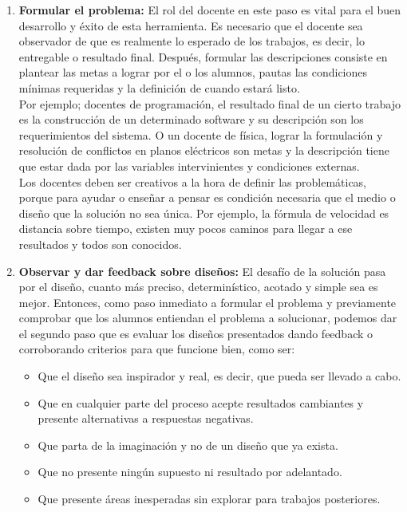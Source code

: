 \begin{enumerate}
 \item \textbf{Formular el problema:}
 El rol del docente en este paso es vital para el buen desarrollo y \'exito de esta herramienta. Es necesario que el docente sea observador de que es realmente
 lo esperado de los trabajos, es decir, lo entregable o resultado final. Despu\'es, formular las descripciones consiste en plantear las metas a lograr por el o 
 los alumnos, pautas las condiciones m\'inimas requeridas y la definici\'on de cuando estar\'a listo.\\
 Por ejemplo; docentes de programaci\'on, el resultado final de un cierto trabajo es la construcci\'on de un determinado software y su descripci\'on son los 
 requerimientos del sistema. O un docente de f\'isica, lograr la formulaci\'on y resoluci\'on de conflictos en planos el\'ectricos son metas y la descripci\'on
 tiene que estar dada por las variables intervinientes y condiciones externas.\\ 
 Los docentes deben ser creativos a la hora de definir las problem\'aticas, porque para ayudar o ense\~nar a pensar es condici\'on necesaria que el medio o 
 dise\~no que la soluci\'on no sea \'unica. Por ejemplo, la f\'ormula de velocidad es distancia sobre tiempo, existen muy pocos caminos para llegar a ese 
 resultados y todos son conocidos. 
 
 \item \textbf{Observar y dar feedback sobre dise\~nos:}
 El desaf\'io de la soluci\'on pasa por el dise\~no, cuanto m\'as preciso, determin\'istico, acotado y simple sea es mejor. Entonces, como paso inmediato a 
 formular el problema y previamente comprobar que los alumnos entiendan el problema a solucionar, podemos dar el segundo paso que es evaluar los dise\~nos 
 presentados dando feedback o corroborando criterios para que funcione bien, como ser:
 \begin{itemize}
  \item Que el dise\~no sea inspirador y real, es decir, que pueda ser llevado a cabo.
  \item Que en cualquier parte del proceso acepte resultados cambiantes y presente alternativas a respuestas negativas.
  \item Que parta de la imaginaci\'on y no de un dise\~no que ya exista.
  \item Que no presente ning\'un supuesto ni resultado por adelantado.
  \item Que presente \'areas inesperadas sin explorar para trabajos posteriores.
 \end{itemize}


\end{enumerate}
